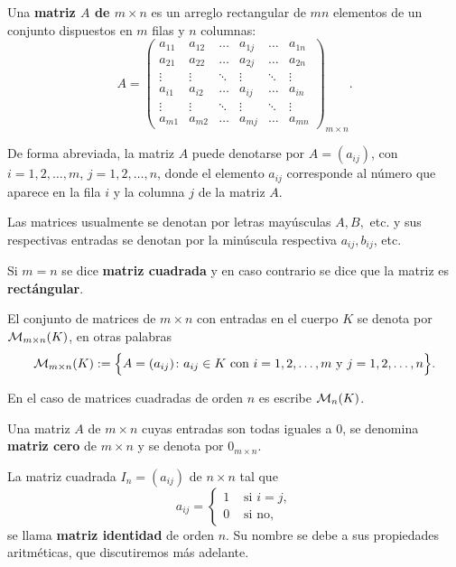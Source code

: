 \begin{defin}
Una \textbf{matriz $A$ de $m \times n$} es un arreglo rectangular de $mn$ elementos de un conjunto dispuestos en $m$ filas y $n$ columnas:
\[A=\left(\begin{array}{cccccc}
     a_{11}& a_{12} & \dots & a_{1j} &\dots & a_{1n}\\
     a_{21}& a_{22} & \dots &a_{2j} &\dots & a_{2n}\\
     \vdots&  \vdots & \ddots &  \vdots &\ddots &  \vdots\\
     a_{i1}& a_{i2} & \dots &a_{ij} &\dots & a_{in}\\
     \vdots&  \vdots & \ddots & \vdots &\ddots &  \vdots\\
     a_{m1}& a_{m2} & \dots & a_{mj} &\dots & a_{mn}
\end{array}\right)_{m\times n}.\]





De forma abreviada, la matriz $A$ puede denotarse por $A=(a_{ij})$, con $i=1,2,\dots, m$, $j=1,2,\dots, n$, donde el elemento $a_{ij}$ corresponde al número que aparece en la fila $i$ y la columna $j$ de la matriz $A$.

Las matrices usualmente se denotan por letras mayúsculas $A, B,$ etc. y sus respectivas entradas se denotan por la minúscula respectiva $a_{ij}, b_{ij}$, etc.

Si $m =n$ se dice \textbf{matriz cuadrada} y en caso contrario se dice que la matriz es \textbf{rect\'angular}.

El conjunto de matrices de $m\times n$ con entradas en el cuerpo $K$ se denota por $\mathcal{M}_{m\times n}(K)$, en otras palabras
\[\mathcal{M}_{m\times n}(K):=\Big\{A=(a_{ij}) \colon a_{ij}\in K \text{ con $i=1,2,\dots, m$ y $j=1,2,\dots, n$}\Big\}.\]
\end{defin}
En el caso de matrices cuadradas de orden $n$ es escribe $\mathcal{M}_n(K)$.


Una matriz $A$ de $m \times n$ cuyas entradas son todas  iguales a 0, se denomina \textbf{matriz cero} de $m \times n$ y se denota por $0_{m\times n}$.

La matriz cuadrada $I_n=(a_{ij})$ de $n\times n$ tal que 
\[a_{ij}=\left\{\begin{array}{ll}
    1 & \text{ si } i= j, \\
   0 & \text{ si no},
\end{array}\right.\]
se llama \textbf{matriz identidad} de orden $n$. Su nombre se debe a sus propiedades aritm\'eticas, que discutiremos m\'as adelante.

